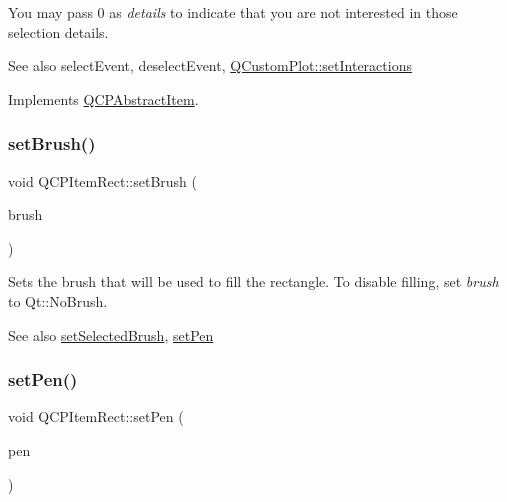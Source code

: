 You may pass 0 as {\itshape details} to indicate that you are not interested in those selection details.

\begin{DoxySeeAlso}{See also}
select\+Event, deselect\+Event, \mbox{\hyperlink{class_q_custom_plot_a5ee1e2f6ae27419deca53e75907c27e5}{Q\+Custom\+Plot\+::set\+Interactions}} 
\end{DoxySeeAlso}


Implements \mbox{\hyperlink{class_q_c_p_abstract_item_a96d522d10ffc0413b9a366c6f7f0476b}{Q\+C\+P\+Abstract\+Item}}.

\mbox{\label{class_q_c_p_item_rect_abbd4e346a03513ee466afc25d9c75446}} 
\subsubsection{\texorpdfstring{set\+Brush()}{setBrush()}}
{\footnotesize\ttfamily void Q\+C\+P\+Item\+Rect\+::set\+Brush (\begin{DoxyParamCaption}\item[{const Q\+Brush \&}]{brush }\end{DoxyParamCaption})}

Sets the brush that will be used to fill the rectangle. To disable filling, set {\itshape brush} to Qt\+::\+No\+Brush.

\begin{DoxySeeAlso}{See also}
\mbox{\hyperlink{class_q_c_p_item_rect_abd1792859844118dedee86223cede7af}{set\+Selected\+Brush}}, \mbox{\hyperlink{class_q_c_p_item_rect_a483c0da5a17e1646cd17ddea2c124e7d}{set\+Pen}} 
\end{DoxySeeAlso}
\mbox{\label{class_q_c_p_item_rect_a483c0da5a17e1646cd17ddea2c124e7d}} 
\subsubsection{\texorpdfstring{set\+Pen()}{setPen()}}
{\footnotesize\ttfamily void Q\+C\+P\+Item\+Rect\+::set\+Pen (\begin{DoxyParamCaption}\item[{const Q\+Pen \&}]{pen }\end{DoxyParamCaption})}

